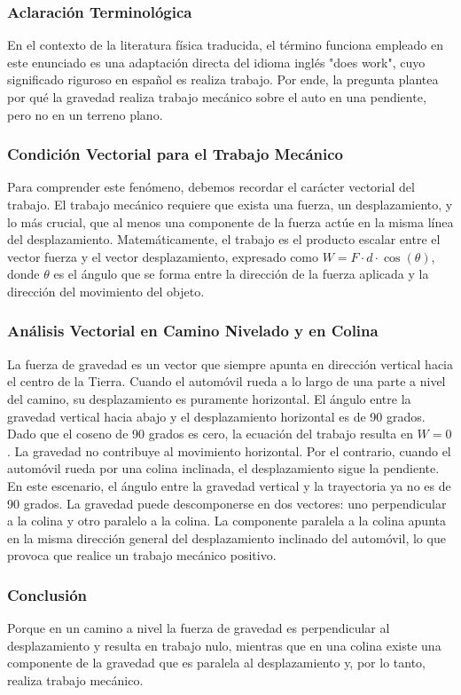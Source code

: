 \documentclass[12pt,a4paper]{article}
\begin{document}
\subsubsection*{Aclaración Terminológica}
En el contexto de la literatura física traducida, el término funciona empleado en este enunciado es una adaptación directa del idioma inglés "does work", cuyo significado riguroso en español es realiza trabajo. Por ende, la pregunta plantea por qué la gravedad realiza trabajo mecánico sobre el auto en una pendiente, pero no en un terreno plano.

\subsubsection*{Condición Vectorial para el Trabajo Mecánico}
Para comprender este fenómeno, debemos recordar el carácter vectorial del trabajo. El trabajo mecánico requiere que exista una fuerza, un desplazamiento, y lo más crucial, que al menos una componente de la fuerza actúe en la misma línea del desplazamiento. Matemáticamente, el trabajo es el producto escalar entre el vector fuerza y el vector desplazamiento, expresado como $W = F \cdot d \cdot \cos(\theta)$, donde $\theta$ es el ángulo que se forma entre la dirección de la fuerza aplicada y la dirección del movimiento del objeto.

\subsubsection*{Análisis Vectorial en Camino Nivelado y en Colina}
La fuerza de gravedad es un vector que siempre apunta en dirección vertical hacia el centro de la Tierra. 
Cuando el automóvil rueda a lo largo de una parte a nivel del camino, su desplazamiento es puramente horizontal. El ángulo entre la gravedad vertical hacia abajo y el desplazamiento horizontal es de 90 grados. Dado que el coseno de 90 grados es cero, la ecuación del trabajo resulta en $W = 0$. La gravedad no contribuye al movimiento horizontal.
Por el contrario, cuando el automóvil rueda por una colina inclinada, el desplazamiento sigue la pendiente. En este escenario, el ángulo entre la gravedad vertical y la trayectoria ya no es de 90 grados. La gravedad puede descomponerse en dos vectores: uno perpendicular a la colina y otro paralelo a la colina. La componente paralela a la colina apunta en la misma dirección general del desplazamiento inclinado del automóvil, lo que provoca que realice un trabajo mecánico positivo.

\subsubsection*{Conclusión}
Porque en un camino a nivel la fuerza de gravedad es perpendicular al desplazamiento y resulta en trabajo nulo, mientras que en una colina existe una componente de la gravedad que es paralela al desplazamiento y, por lo tanto, realiza trabajo mecánico.
\end{document}
